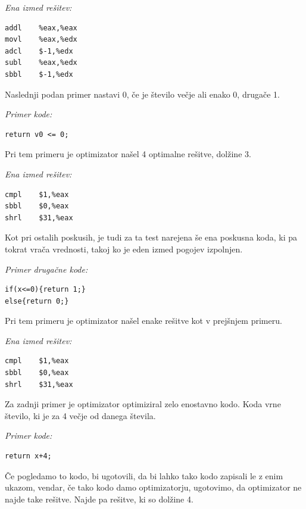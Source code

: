 \documentclass[a4paper, 12pt]{book}
\begin{document}
\medskip

\noindent
{\it Ena izmed rešitev:}
\begin{Verbatim}[baselinestretch=1]
addl    %eax,%eax
movl    %eax,%edx
adcl    $-1,%edx
subl    %eax,%edx
sbbl    $-1,%edx
\end{Verbatim}

Naslednji podan primer nastavi 0, če je število večje ali enako 0, drugače 1.

\medskip

\noindent
{\it Primer kode:}
\begin{Verbatim}[baselinestretch=1]
return v0 <= 0;
\end{Verbatim}

Pri tem primeru je optimizator našel 4 optimalne rešitve, dolžine 3.

\medskip

\noindent
{\it Ena izmed rešitev:}
\begin{Verbatim}[baselinestretch=1]
cmpl    $1,%eax
sbbl    $0,%eax
shrl    $31,%eax
\end{Verbatim}

Kot pri ostalih poskusih, je tudi za ta test narejena še ena poskusna koda, ki pa tokrat vrača vrednosti, takoj ko je eden izmed pogojev izpolnjen.

\medskip

\noindent
{\it Primer drugačne kode:}
\begin{Verbatim}[baselinestretch=1]
if(x<=0){return 1;}
else{return 0;}
\end{Verbatim}

Pri tem primeru je optimizator našel enake rešitve kot v prejšnjem primeru.

\medskip

\noindent
{\it Ena izmed rešitev:}
\begin{Verbatim}[baselinestretch=1]
cmpl    $1,%eax
sbbl    $0,%eax
shrl    $31,%eax
\end{Verbatim}

Za zadnji primer je optimizator optimiziral zelo enostavno kodo. Koda vrne število, ki je za 4 večje od danega števila.

\medskip

\noindent
{\it Primer kode:}
\begin{Verbatim}[baselinestretch=1]
return x+4;
\end{Verbatim}

Če pogledamo to kodo, bi ugotovili, da bi lahko tako kodo zapisali le z enim ukazom, vendar, če tako kodo damo optimizatorju, ugotovimo, da optimizator ne najde take rešitve. Najde pa rešitve, ki so dolžine 4.
\end{document}
